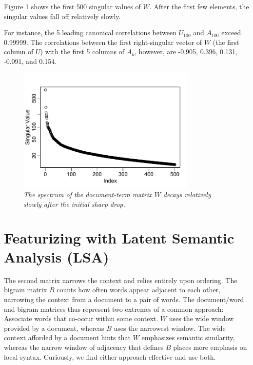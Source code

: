 \documentclass[10pt]{article}
\begin{document}
 Figure \ref{fig:spectrum} shows the first 500 singular values of $W$.  After
 the first few elements, the singular values fall off relatively slowly.  

  For instance, the 5 leading canonical correlations between $U_{100}$ and
 $A_{100}$ exceed 0.99999.  The correlations between the first right-singular
 vector of $W$ (the first column of $U$) with the first 5 columns of $A_k$,
 however, are -0.905, 0.396, 0.131, -0.091, and 0.154.  
 
 \begin{figure}
 \caption{ 
 	\label{fig:spectrum}
	{\sl The spectrum of the document-term matrix $W$ decays relatively slowly 
	      after the initial sharp drop. }}

 \centerline{
 \vspace{0.1in}
 \includegraphics[width=3.5in]{figures/spectrum} }
 \vspace{0.2in}
 \end{figure}
   


 
\section{Featurizing with Latent Semantic Analysis (LSA)}
\label{sec:cca}



 The second matrix narrows the context and relies entirely upon ordering.  The bigram matrix $B$ counts how often words  appear adjacent to each other, narrowing the context from a document to a pair of words.  The document/word and bigram matrices thus represent two extremes of a common approach:  Associate words that co-occur within some context.  $W$ uses the wide window provided by a document, whereas $B$ uses the narrowest window. The wide context afforded by a document hints that $W$ emphasizes semantic similarity, whereas the narrow window of adjacency that defines $B$ places more emphasis on local syntax.  Curiously, we find either approach effective and use both.
\end{document}
